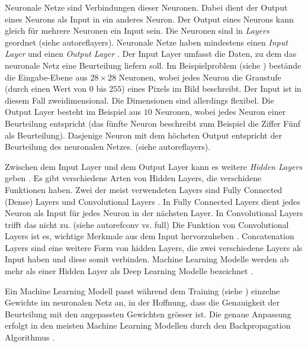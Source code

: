 Neuronale Netze sind Verbindungen dieser Neuronen. Dabei dient der Output eines
Neurons als Input in ein anderes Neuron. Der Output eines Neurons kann gleich
für mehrere Neuronen ein Input sein. Die Neuronen sind in \emph{Layers} geordnet
(siehe autoref{layers}). Neuronale Netze haben mindestens einen \emph{Input
Layer} und einen \emph{Output Layer}
\cite{nielsen_neural_2015}\cite{ognjanovski_everything_2020}. Der Input Layer
umfasst die Daten, zu dem das neuronale Netz eine Beurteilung liefern soll. Im
Beispielproblem (siehe ) bestände die Eingabe-Ebene aus
$28\times28$ Neuronen, wobei jedes Neuron die Graustufe (durch einen Wert von
$0$ bis $255$) eines Pixels im Bild beschreibt. Der Input ist in diesem Fall
zweidimensional. Die Dimensionen sind allerdings flexibel. Die Output Layer
besteht im Beispiel aus $10$ Neuronen, wobei jedes Neuron einer Beurteilung
entspricht (das fünfte Neuron beschreibt zum Beispiel die Ziffer Fünf als
Beurteilung). Dasjenige Neuron mit dem höchsten Output entspricht der
Beurteilung des neuronalen Netzes. (siehe autoref{layers}).


Zwischen dem Input Layer und dem Output Layer kann es weitere \emph{Hidden
Layers} geben \cite{malik_what_2019}. Es gibt verschiedene Arten von Hidden
Layers, die verschidene Funktionen haben. Zwei der meist verwendeten Layers sind
Fully Connected (Dense) Layers und Convolutional Layers
\cite{unzueta_convolutional_2022}. In Fully Connected Layers dient jedes Neuron
als Input für jedes Neuron in der nächsten Layer. In Convolutional Layers trifft
das nicht zu. (siehe autoref{conv vs. full}) Die Funktion von Convolutional
Layers ist es, wichtige Merkmale aus dem Input hervorzuheben
\cite{deshpande_beginners_nodate}. Concatenation Layers
\cite{jayawardana_concatenating_2021} sind eine weitere Form von hidden Layers,
die zwei verschiedene Layers als Input haben und diese somit verbinden. Machine
Learning Modelle werden ab mehr als einer Hidden Layer als Deep Learning Modelle
bezeichnet \cite{jan-dirk_kranz_deep_2019}.


Ein Machine Learning Modell passt während dem Training (siehe
) einzelne Gewichte im neuronalen Netz an, in der Hoffnung,
dass die Genauigkeit der Beurteilung mit den angepassten Gewichten grösser
ist. Die genaue Anpassung erfolgt in den meisten Machine Learning Modellen durch
den Backpropagation Algorithmus
\cite{ognjanovski_everything_2020}\cite{david_e_rumelhart_learning_nodate}.

